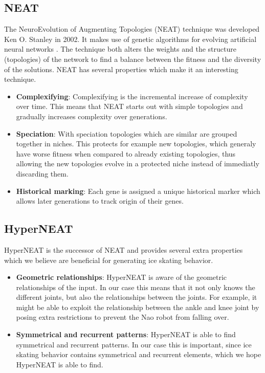 \documentclass[10pt]{article}
\begin{document}
\subsection{NEAT}
The NeuroEvolution of Augmenting Topologies (NEAT) technique was developed Ken O. Stanley in 2002. It makes use of genetic algorithms for evolving artificial neural networks \cite{wikipedia:neat}. The technique both alters the weights and the structure (topologies) of the network to find a balance between the fitness and the diversity of the solutions. NEAT has several properties which make it an interesting technique.

\begin{itemize}
	\item \textbf{Complexifying}: Complexifying is the incremental increase of complexity over time. This means that NEAT starts out with simple topologies and gradually increases complexity over generations.
	\item \textbf{Speciation}: With speciation topologies which are similar are grouped together in niches. This protects for example new topologies, which generaly have worse fitness when compared to already existing topologies, thus allowing the new topologies evolve in a protected niche instead of immediatly discarding them.
	\item \textbf{Historical marking}: Each gene is assigned a unique historical marker which allows later generations to track origin of their genes.  
\end{itemize}

\subsection{HyperNEAT}
HyperNEAT is the successor of NEAT and provides several extra properties which we believe are beneficial for generating ice skating behavior.

\begin{itemize}
	\item \textbf{Geometric relationships}: HyperNEAT is aware of the geometric relationships of the input. In our case this means that it not only knows the different joints, but also the relationships between the joints. For example, it might be able to exploit the relationship between the ankle and knee joint by posing extra restrictions to prevent the Nao robot from falling over.
	\item \textbf{Symmetrical and recurrent patterns}: HyperNEAT is able to find symmetrical and recurrent patterns. In our case this is important, since ice skating behavior contains symmetrical and recurrent elements, which we hope HyperNEAT is able to find.
\end{itemize}
\end{document}

